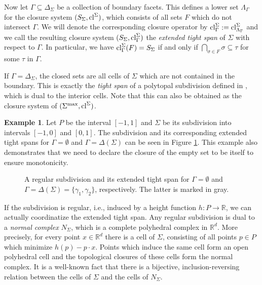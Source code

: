\documentclass[11pt,a4paper]{amsart}
\theoremstyle{definition}
\newtheorem{example}[definition]{Example}
\theoremstyle{plain}
\begin{document}
Now let $\Gamma \subseteq \Delta_\Sigma$ be a collection of boundary facets. This defines a lower set $\Lambda_\Gamma$ for the closure system $(S_\Sigma, {\textnormal{cl}}^\Sigma)$, which consists of all sets $F$ which do not intersect $\Gamma$. We will denote the corresponding closure operator by ${\textnormal{cl}}^\Sigma_\Gamma := {\textnormal{cl}}^\Sigma_{\Lambda_\Gamma}$ and we call the resulting closure system $(S_\Sigma, {\textnormal{cl}}^\Sigma_\Gamma)$ the \emph{extended tight span} of $\Sigma$ with respect to $\Gamma$. 
In particular, we have ${\textnormal{cl}}^\Sigma_\Gamma(F) = S_\Sigma$ if and only if 
$\bigcap_{\sigma \in F} \sigma \subseteq \tau$ for some $\tau$ in $\Gamma$.

If $\Gamma = \Delta_\Sigma$, the closed sets are all cells of $\Sigma$ which are not contained in the boundary.
This is exactly the \emph{tight span} of a polytopal subdivision defined in \cite{HerrmannJensenJoswigSturmfels:2009}, which is dual to the interior cells.
Note that this can also be obtained as the closure system of $(\Sigma^{\max},{\textnormal{cl}}^\Sigma)$.

\begin{example}
 Let $P$ be the interval $[-1,1]$ and $\Sigma$ be its subdivision into intervals $[-1,0]$ and $[0,1]$. The subdivision and its corresponding extended tight spans for $\Gamma = \emptyset$ and $\Gamma = \Delta(\Sigma)$ can be seen in Figure \ref{figure:interval}. This example also demonstrates that we need to declare the closure of the empty set to be itself to ensure monotonicity.
 \begin{figure}
  \centering
  

 \caption{A regular subdivision and its extended tight span for $\Gamma = \emptyset$ and $\Gamma = \Delta(\Sigma) = \{\gamma_1,\gamma_2\}$, respectively. The latter is marked in gray.}\label{figure:interval}
 \end{figure}

\end{example}

If the subdivision is regular, i.e., induced by a height function $h: P \to {\mathbb{R}}$, we can actually coordinatize the extended tight span. Any regular subdivision is dual to a \emph{normal complex} $N_\Sigma$, which is a complete polyhedral complex in ${\mathbb{R}}^d$. More precisely, for every point $x \in {\mathbb{R}}^d$ there is a cell of $\Sigma$, consisting of all points $p \in P$ which minimize $h(p) - p \cdot x$. Points which induce the same cell form an open polyhedral cell and the topological closures of these cells form the normal complex. It is a well-known fact that there is a bijective, inclusion-reversing relation between the cells of $\Sigma$ and the cells of $N_\Sigma$.
\end{document}
